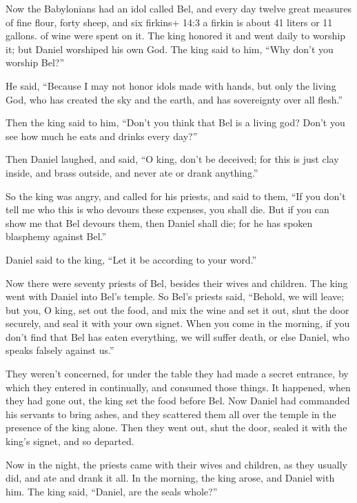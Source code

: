  Now the Babylonians had an idol called Bel, and every day
twelve great measures of fine flour, forty sheep, and six firkins+ 14:3
a firkin is about 41 liters or 11 gallons. of wine were spent on it.
 The king honored it and went daily to worship it; but
Daniel worshiped his own God. The king said to him, ``Why don't you
worship Bel?''

 He said, ``Because I may not honor idols made with hands,
but only the living God, who has created the sky and the earth, and has
sovereignty over all flesh.''

 Then the king said to him, ``Don't you think that Bel is a
living god? Don't you see how much he eats and drinks every day?''

 Then Daniel laughed, and said, ``O king, don't be deceived;
for this is just clay inside, and brass outside, and never ate or drank
anything.''

 So the king was angry, and called for his priests, and said
to them, ``If you don't tell me who this is who devours these expenses,
you shall die.  But if you can show me that Bel devours
them, then Daniel shall die; for he has spoken blasphemy against Bel.''

Daniel said to the king, ``Let it be according to your word.''

 Now there were seventy priests of Bel, besides their wives
and children. The king went with Daniel into Bel's temple. 
So Bel's priests said, ``Behold, we will leave; but you, O king, set out
the food, and mix the wine and set it out, shut the door securely, and
seal it with your own signet.  When you come in the
morning, if you don't find that Bel has eaten everything, we will suffer
death, or else Daniel, who speaks falsely against us.''

 They weren't concerned, for under the table they had made
a secret entrance, by which they entered in continually, and consumed
those things.  It happened, when they had gone out, the
king set the food before Bel. Now Daniel had commanded his servants to
bring ashes, and they scattered them all over the temple in the presence
of the king alone. Then they went out, shut the door, sealed it with the
king's signet, and so departed.

 Now in the night, the priests came with their wives and
children, as they usually did, and ate and drank it all. 
In the morning, the king arose, and Daniel with him.  The
king said, ``Daniel, are the seals whole?''

